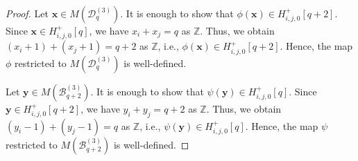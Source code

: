 \documentclass{article}
\theoremstyle{plain}
\theoremstyle{definition}
\theoremstyle{remark}
\numberwithin{equation}{section}
\newcommand{\Bc}{\mathcal{B}}
\newcommand{\Dc}{\mathcal{D}}
\newcommand{\ZZ}{\mathbb{Z}}
\begin{document}
\begin{proof}
Let $\bm{x} \in M(\Dc_q^{(3)})$. It is enough to show that $\phi(\bm{x}) \in H_{i,j,0}^+[q+2]$. 
Since $\bm{x} \in H_{i,j,0}^+[q]$, we have $x_i + x_j = q$ as $\ZZ$. Thus, we obtain $(x_i + 1) + (x_j + 1) = q+2$ as $\ZZ$, i.e., $\phi(\bm{x}) \in H_{i,j,0}^+[q+2]$. 
Hence, the map $\phi$ restricted to $M(\Dc_q^{(3)})$ is well-defined. 


Let $\bm{y} \in M(\Bc_{q+2}^{(3)})$. It is enough to show that $\psi(\bm{y}) \in H_{i,j,0}^+[q]$. 
Since $\bm{y} \in H_{i,j,0}^+[q+2]$, we have $y_i + y_j = q+2$ as $\ZZ$. Thus, we obtain $(y_i - 1) + (y_j - 1) = q$ as $\ZZ$, i.e., $\psi(\bm{y}) \in H_{i,j,0}^+[q]$. 
Hence, the map $\psi$ restricted to $M(\Bc_{q+2}^{(3)})$ is well-defined. 


\end{proof}
\end{document}
